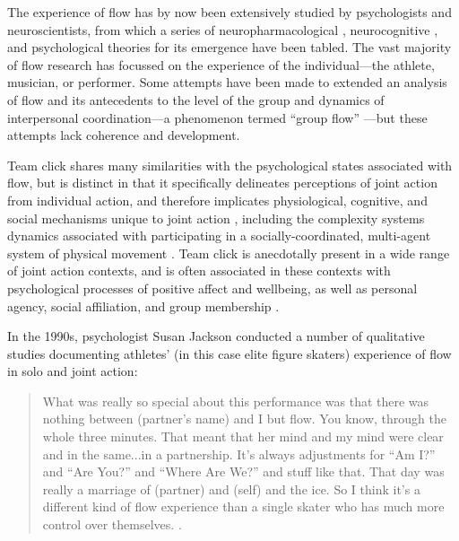 \begin{CJK}{UTF8}{gbsn}

    The experience of flow has by now been extensively studied by psychologists and neuroscientists, from which a series of neuropharmacological \citep{Boecker2008}, neurocognitive \citep{Dietrich2006,Dietrich2011,Labelle2013}, and psychological \citep{Csikszentmihalyi1992} theories for its emergence have been tabled.  The vast majority of flow research has focussed on the experience of the individual---the athlete, musician, or performer.  Some attempts have been made to extended an analysis of flow and its antecedents to the level of the group and dynamics of interpersonal coordination---a phenomenon termed ``group flow'' \citep{Sawyer2006}---but these attempts lack coherence and development.

    Team click shares many similarities with the psychological states associated with flow, but is distinct in that it specifically delineates perceptions of joint action from individual action, and therefore implicates physiological, cognitive, and social mechanisms unique to joint action \citep{Vesper2010}, including the complexity systems dynamics associated with participating in a socially-coordinated, multi-agent system of physical movement \citep{Kelso2009}.  Team click is anecdotally present in a wide range of joint action contexts, and is often associated in these contexts with psychological processes of positive affect and wellbeing, as well as personal agency, social affiliation, and group membership \citep{Jackson1995,Marsh2009,Wheatley2012,Slingerland2014}.

    In the 1990s, psychologist Susan Jackson conducted a number of qualitative studies documenting athletes' (in this case elite figure skaters) experience of flow in solo and joint action:

    \begin{quotation}
      What was really so special about this performance was that there was nothing between (partner's name) and I but flow.  You know, through the whole three minutes.  That meant that her mind and my mind were clear and in the same...in a partnership. It’s always adjustments for ``Am I?'' and ``Are You?'' and ``Where Are We?'' and stuff like that.  That day was really a marriage of (partner) and (self) and the ice.  So I think it’s a different kind of flow experience than a single skater who has much more control over themselves. \citep[173-4]{Jackson1992}.
    \end{quotation}


\end{CJK}
